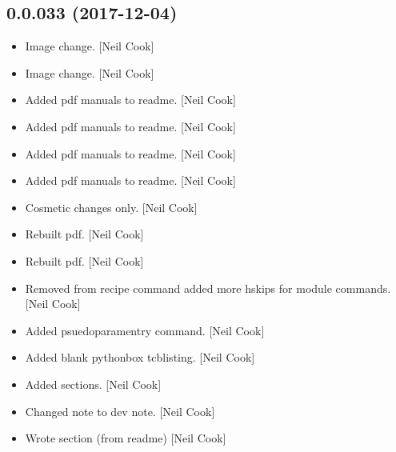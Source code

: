 \documentclass[a4paper,10pt,english]{report}
\begin{document}
\subsection{0.0.033 (2017-12-04)}
\label{\detokenize{misc/changelog:id519}}\begin{itemize}
\item {} 
Image change. {[}Neil Cook{]}

\item {} 
Image change. {[}Neil Cook{]}

\item {} 
Added pdf manuals to readme. {[}Neil Cook{]}

\item {} 
Added pdf manuals to readme. {[}Neil Cook{]}

\item {} 
Added pdf manuals to readme. {[}Neil Cook{]}

\item {} 
Added pdf manuals to readme. {[}Neil Cook{]}

\item {} 
Cosmetic changes only. {[}Neil Cook{]}

\item {} 
Rebuilt pdf. {[}Neil Cook{]}

\item {} 
Rebuilt pdf. {[}Neil Cook{]}

\item {} 
Removed  from recipe command added more hskips for module commands.
{[}Neil Cook{]}

\item {} 
Added psuedoparamentry command. {[}Neil Cook{]}

\item {} 
Added blank pythonbox tcblisting. {[}Neil Cook{]}

\item {} 
Added sections. {[}Neil Cook{]}

\item {} 
Changed note to dev note. {[}Neil Cook{]}

\item {} 
Wrote section (from readme) {[}Neil Cook{]}

\end{itemize}
\end{document}
